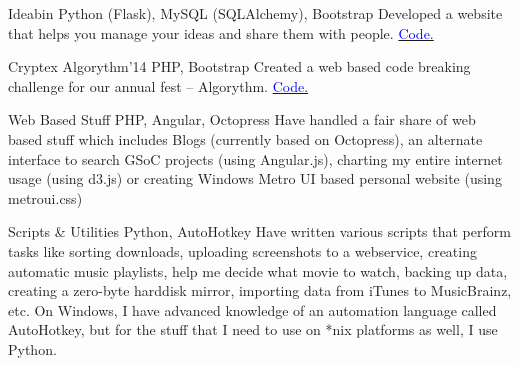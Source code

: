     {Ideabin}
    {}
    {\scriptsize Python (Flask), MySQL (SQLAlchemy), Bootstrap}
    {}
    {
        Developed a website that helps you manage your ideas and share them with people.
        \hfill
        \href{http://github.com/ideabin/ideabin/}{\textcolor{blue}{\scriptsize Code.}}
    }
    \vspace*{0.2\baselineskip}

    {Cryptex}
    {Algorythm'14}
    {\scriptsize PHP, Bootstrap}
    {}
    {
        Created a web based code breaking challenge for our annual fest -- Algorythm.
        \hfill
        \href{http://github.com/jdevlabs/cryptex/}{\textcolor{blue}{\scriptsize Code.}}
    }
    \vspace*{0.2\baselineskip}

\cventry{}
    {Web Based Stuff}
    {}
    {\scriptsize PHP, Angular, Octopress}
    {}
    {
        Have handled a fair share of web based stuff which includes Blogs (currently based on Octopress), an alternate interface to search GSoC projects (using Angular.js), charting my entire internet usage (using d3.js) or creating Windows Metro UI based personal website (using metroui.css)
    }
    \vspace*{0.2\baselineskip}

\cventry{}
    {Scripts \& Utilities}
    {}
    {\scriptsize Python, AutoHotkey}
    {}
    {
        Have written various scripts that perform tasks like sorting downloads, uploading screenshots to a webservice, creating automatic music playlists, help me decide what movie to watch, backing up data, creating a zero-byte harddisk mirror, importing data from iTunes to MusicBrainz, etc.
        On Windows, I have advanced knowledge of an automation language called AutoHotkey, but for the stuff that I need to use on *nix platforms as well, I use Python.
    }
    \vspace*{0.2\baselineskip}
